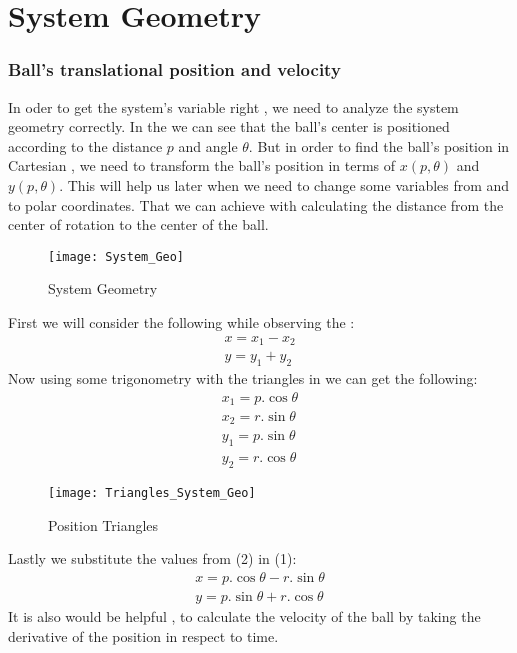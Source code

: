 \chapter{System Geometry}
\subsection{Ball's translational position and velocity}
In oder to get the system's variable right , we need to analyze the system geometry correctly.
In the  we can see that the ball's center is positioned according to the distance $p$ and angle $\theta$.
But in order to find the ball's position in Cartesian , we need to transform the ball's position in terms of $x(p,\theta)$ and $y(p,\theta)$.
This will help us later when we need to change some variables from and to polar coordinates.
That we can achieve with calculating the distance from the center of rotation to the center of the ball. 

\begin{figure}[h]
	\centering
	\texttt{[image: System\_Geo]}
	\caption{System Geometry}\label{SystemGeometry}
\end{figure}
\newpage
First we will consider the following while observing the :
\begin{equation}
	\begin{split}
		x = x_1 - x_2 \\
		y = y_1 + y_2 
	\end{split}
\end{equation}
Now using some trigonometry with the triangles in  we can get the following:
\begin{equation}
	\begin{split}
		x_1 = p.\cos{\theta} \\
		x_2 = r.\sin{\theta} \\
		y_1 = p.\sin{\theta} \\
		y_2 = r.\cos{\theta} 
	\end{split}
\end{equation}

\begin{figure}[h]
	\centering
	\texttt{[image: Triangles\_System\_Geo]}
	\caption{Position Triangles}\label{SystemGeometry_Triangles}
\end{figure}
Lastly we substitute the values from (2) in (1):
\begin{equation}
	\begin{split}
		x = p.\cos{\theta} - r.\sin{\theta}\\
		y = p.\sin{\theta} + r.\cos{\theta}
	\end{split}
\end{equation}
It is also would be helpful , to calculate the velocity of the ball by taking the derivative of the position in respect to time.

